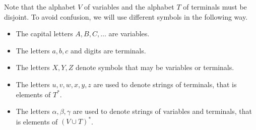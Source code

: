 

\setcounter{section}{5}
\setcounter{subsection}{1}
\setcounter{dfn}{2}


Note that the alphabet $V$ of variables and the alphabet $T$ of terminals must be disjoint.
To avoid confusion, we will use different symbols in the following way.
\begin{itemize}
\item
The capital letters $A, B, C, \ldots$ are variables.
\item
The letters $a, b, c$ and digits are terminals.
\item
The letters $X, Y, Z$ denote symbols that may be variables or terminals.
\item
The letters $u, v, w, x, y, z$ are used to denote strings of terminals, that is elements of $T^*$.
\item
The letters $\alpha, \beta, \gamma$ are used to denote strings of variables and terminals, that is elements of $(V \cup T)^*$.
\end{itemize}



